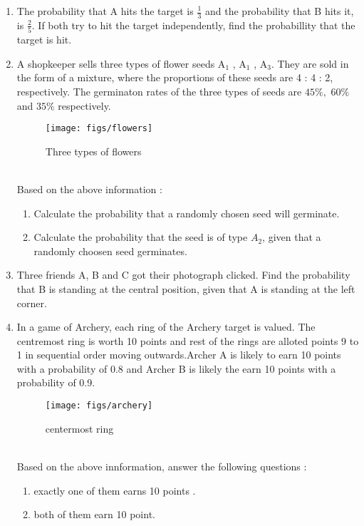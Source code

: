 \begin{enumerate}
\item The probability that A hits the target is $\frac{1}{3}$ and the probability that B hits it, is $\frac{2}{5}.$ If both try to hit the target independently, find the probabillity that the target is hit. 
\item A shopkeeper sells three types of flower seeds A$_1$ , A$_1$ , A$_3$. They are sold in the form of a mixture, where the proportions of these seeds are  4 : 4 : 2, respectively. The germinaton rates of the three types of seeds are $45\%,$ $60\%$ and $35\%$ respectively.
\begin{figure}[!ht]
\centering                                  \texttt{[image: figs/flowers]}                                     
\caption{Three types of flowers}            
\label{fig:flowers11}                       
\end{figure}
\\ Based on  the above information :
\begin{enumerate}
\item  Calculate the probability that a randomly chosen seed will germinate.
\item  Calculate the probability  that the seed is of type $A_2$, given that a randomly choosen seed germinates.
\end{enumerate}
\item Three friends A, B and C got their photograph clicked. Find the probability that B is standing at the central position, given that A is standing at the left corner.
\item In a game of Archery, each ring of the Archery target is valued. The centremost ring is worth 10 points and rest of the rings are alloted points 9 to 1 in sequential order moving outwards.Archer A is likely to earn 10 points with a probability of 0.8 and Archer B is likely the earn 10 points with a probability of 0.9.
\begin{figure}[!ht]                     
\centering
\texttt{[image: figs/archery]}
\caption{centermost ring}                   
\label{fig:archery3}                        
\end{figure}
\\ Based on the above innformation, answer the following questions :
\begin{enumerate}
\item exactly one of them earns 10 points .
\item both of them earn 10 point.
\end{enumerate}

\end{enumerate}
